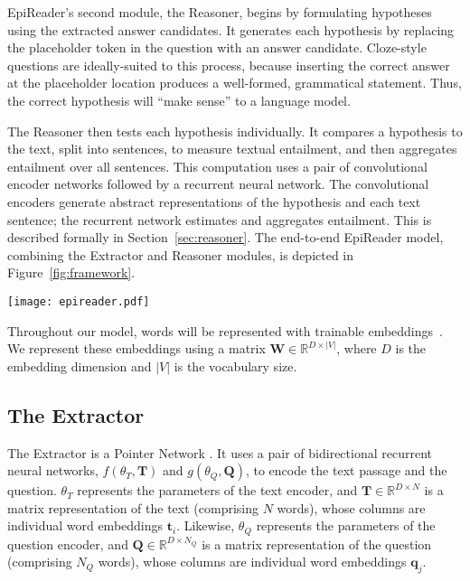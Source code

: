 \documentclass[11pt,letterpaper]{article}
\def\x{\times}
\begin{document}
EpiReader's second module, the Reasoner, begins by formulating hypotheses using the extracted answer candidates. It generates each hypothesis by replacing the placeholder token in the question with an answer candidate. Cloze-style questions are ideally-suited to this process, because inserting the correct answer at the placeholder location produces a well-formed, grammatical statement. Thus, the correct hypothesis will ``make sense'' to a language model.

The Reasoner then tests each hypothesis individually. It compares a hypothesis to the text, split into sentences, to measure textual entailment, and then aggregates entailment over all sentences. This computation uses a pair of convolutional encoder networks followed by a recurrent neural network. The convolutional encoders generate abstract representations of the hypothesis and each text sentence; the recurrent network estimates and aggregates entailment. This is described formally in Section~\ref{sec:reasoner}. The end-to-end EpiReader model, combining the Extractor and Reasoner modules, is depicted in Figure~\ref{fig:framework}.

\begin{figure*}[t]
  \centering
  \texttt{[image: epireader.pdf]}
  \caption{The complete EpiReader framework. The Extractor is above, the Reasoner below. Propagating the Extractor's probability estimates forward and combining them with the Reasoner's entailment estimates renders the model end-to-end differentiable.}
  \label{fig:framework}
\end{figure*}

Throughout our model, words will be represented with trainable embeddings~\cite{bengio2000}. We represent these embeddings using a matrix $\mathbf{W} \in \mathbb{R}^{D \x |V|}$, where $D$ is the embedding dimension and $|V|$ is the vocabulary size.

\subsection{The Extractor}
\label{sec:extractor}
The Extractor is a Pointer Network \cite{vinyals2015}. It uses a pair of bidirectional recurrent neural networks, $f(\theta_T, \mathbf{T})$ and $g(\theta_Q, \mathbf{Q})$, to encode the text passage and the question. $\theta_T$ represents the parameters of the text encoder, and $\mathbf{T} \in \mathbb{R}^{D \x N}$ is a matrix representation of the text (comprising $N$ words), whose columns are individual word embeddings $\mathbf{t}_i$. Likewise, $\theta_Q$ represents the parameters of the question encoder, and $\mathbf{Q} \in \mathbb{R}^{D \x N_Q}$ is a matrix representation of the question (comprising $N_Q$ words), whose columns are individual word embeddings $\mathbf{q}_j$.
\end{document}
